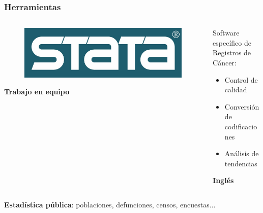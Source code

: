 \documentclass{beamer}
\begin{document}

\begin{frame}\frametitle{Herramientas}
	\begin{columns}
		\begin{column}{0.4\textwidth}
			\begin{figure}
				\centering
				\includegraphics[width=.7\textwidth]{images/stata.jpg}
			\end{figure}
		
			\vspace{50pt}
			
			\centering
			\textbf{Trabajo en equipo}
			
		\end{column}
		\begin{column}{0.6\textwidth}
			\centering
			Software específico de Registros de Cáncer:\\

			\begin{itemize}
				\item 			\centering Control de calidad
				\item 			\centering Conversión de codificaciones
				\item 			\centering Análisis de tendencias
			\end{itemize}	
			\vspace{41pt}
			\centering
			\textbf{Inglés}
		\end{column}
	\end{columns}
	
	\vspace{25pt}
	\centering
	\textbf{Estadística pública}: poblaciones, defunciones, censos, encuestas...
\end{frame}

\end{document}
